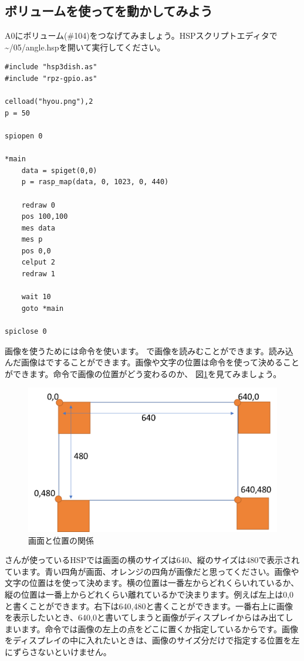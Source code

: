 \subsection{ボリュームを使ってを動かしてみよう}
A0にボリューム(\#104)をつなげてみましょう。HSPスクリプトエディタで\textasciitilde /05/angle.hspを開いて実行してください。\\

\begin{lstlisting}[caption=angle.hsp,label=angle.hsp]
#include "hsp3dish.as"
#include "rpz-gpio.as"

celload("hyou.png"),2
p = 50

spiopen 0

*main
	data = spiget(0,0)
	p = rasp_map(data, 0, 1023, 0, 440)

	redraw 0
	pos 100,100
	mes data
	mes p
	pos 0,0
	celput 2
	redraw 1

	wait 10	
	goto *main

spiclose 0
\end{lstlisting}

画像を使うためには命令を使います。
で画像を読みむことができます。読み込んだ画像はですることができます。画像や文字の位置は命令を使って決めることができます。命令で画像の位置がどう変わるのか、 図\ref{angle.hsp}を見てみましょう。

\begin{figure}[H]
\centering
\includegraphics[scale=0.8]{images/chap05/text05-img034.png}
\caption{画面と位置の関係}
\label{angle.hsp}
\end{figure}

さんが使っているHSPでは画面の横のサイズは640、縦のサイズは480で表示されています。青い四角が画面、オレンジの四角が画像だと思ってください。画像や文字の位置はを使って決めます。横の位置は一番左からどれくらいれているか、縦の位置は一番上からどれくらい離れているかで決まります。例えば左上は0,0と書くことができます。右下は640,480と書くことができます。一番右上に画像を表示したいとき、640,0と書いてしまうと画像がディスプレイからはみ出てしまいます。命令では画像の左上の点をどこに置くか指定しているからです。画像をディスプレイの中に入れたいときは、画像のサイズ分だけで指定する位置を左にずらさないといけません。\\


